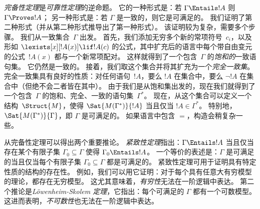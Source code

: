 \emph{完备性定理}是\emph{可靠性定理}的逆命题。
它的一种形式是：若 $\Gamma \Entails !A$ 则 $\Gamma \Proves !A$；
另一种形式是：若 $\Gamma$ 是一致的，则它是可满足的。
我们证明了第二种形式（并从第二种形式推导出了第一种形式）。
该证明较为复杂，需要多个步骤。
我们从一致集合~$\Gamma$ 出发。
首先，我们添加无穷多个新的常项符号~$c_i$，以及形如 $\lexists[x][!A(x)] \lif !A(c)$ 的公式，其中扩充后的语言中每个带自由变元的公式~$!A(x)$ 都与一个新常项配对。
这样就得到了一个包含~$\Gamma$ 的\emph{饱和的}一致语句集。
它仍然是一致的。
接着，我们取这个集合并将其扩充为一个\emph{完全一致集}。
完全一致集具有良好的性质：对任何语句~$!A$，要么 $!A$ 在集合中，要么 $\lnot !A$ 在集合中（但绝不会二者皆在其中）。
由于我们是从饱和集出发的，现在我们就得到了一个包含~$\Gamma$ 的饱和、完全、一致的语句集~$\Gamma^*$。
现在，从这个集合可以定义一个结构~$\Struct{M}$，使得 $\Sat{M(\Gamma^*)}{!A}$ 当且仅当 $!A \in \Gamma^*$。
特别地，$\Sat{M(\Gamma^*)}{\Gamma}$，即 $\Gamma$ 是可满足的。
如果语言中包含 $=$，构造会稍复杂一些。

从完备性定理可以得出两个重要推论。
\emph{紧致性定理}指出：$\Gamma \Entails !A$ 当且仅当存在某个有限子集 $\Gamma_0 \subseteq \Gamma$ 使得 $\Gamma_0 \Entails !A$。
一个等价的表述是：$\Gamma$ 是可满足的当且仅当每个有限子集 $\Gamma_0 \subseteq \Gamma$ 都是可满足的。
紧致性定理可用于证明具有特定性质的结构的存在性。
例如，我们可以用它证明：对于每个具有任意大有穷模型的理论，都存在无穷模型。
这尤其意味着，\emph{有穷性}无法在一阶逻辑中表达。
第二个推论是\emph{Löwenheim-Skolem 定理}，它指出：每个可满足的 $\Gamma$ 都有一个可数模型。
这进而表明，\emph{不可数性}也无法在一阶逻辑中表达。